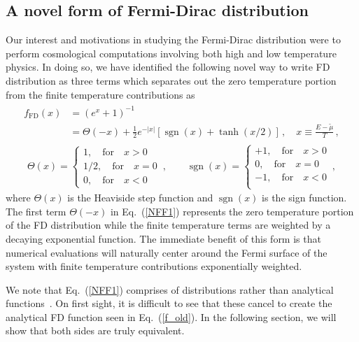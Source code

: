 \documentclass[sn-mathphys,Numbered]{sn-jnl}
\newcommand{\req}[1]{Eq.~(\ref{#1})}
\DeclareMathOperator{\sgn}{sgn}
\begin{document}
\subsection{A novel form of Fermi-Dirac distribution}
\label{Novel}
Our interest and motivations in studying the Fermi-Dirac distribution were to perform cosmological computations involving both high and low temperature physics. In doing so, we have identified the following novel way to write FD distribution as three terms which separates out the zero temperature portion from the finite temperature contributions as 
\begin{align}
\label{NFF1}
\begin{split}
f_\mathrm{FD}(x)
&=\left(e^{x}+1\right)^{-1}\\
&=\Theta(-x)+\frac{1}{2}e^{-|x|}\left[\sgn(x)+\tanh(x/2)\right]\,,\quad
x\equiv\frac{E-\widetilde\mu}{T}\,,
\end{split}
\end{align}
\begin{align}
\label{NFF2}
\Theta(x)=\left\{
\begin{array}{r}
1,\quad\mathrm{for}\quad{x}>0\\
1/2,\quad\mathrm{for}\quad{x}=0\\
0,\quad\mathrm{for}\quad{x}<0
\end{array}\right.\,,\qquad
\sgn(x)=\left\{
\begin{array}{r}
+1,\quad\mathrm{for}\quad{x}>0\\
0,\quad\mathrm{for}\quad{x}=0\\
-1,\quad\mathrm{for}\quad{x}<0\\
\end{array}\right.\,,
\end{align}
where $\Theta(x)$ is the Heaviside step function and $\sgn(x)$ is the sign function. The first term $\Theta(-x)$ in \req{NFF1} represents the zero temperature portion of the FD distribution while the finite temperature terms are weighted by a decaying exponential function. The immediate benefit of this form is that numerical evaluations will naturally center around the Fermi surface of the system with finite temperature contributions exponentially weighted.

We note that \req{NFF1} comprises of distributions rather than analytical functions~\cite{Arfken:2011abc}. On first sight, it is difficult to see that these cancel to create the analytical FD function seen in \req{f_old}. In the following section, we will show that both sides are truly equivalent.
\end{document}
